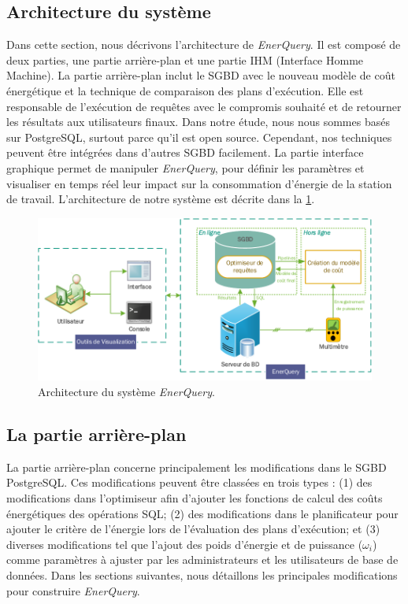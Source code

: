 \subsection{Architecture du système}\label{sec:Architecture}
Dans cette section, nous décrivons l'architecture de \textit{EnerQuery}. Il est composé de deux parties, une partie arrière-plan et une partie IHM (Interface Homme Machine). La partie arrière-plan inclut le SGBD avec le nouveau modèle de coût énergétique et la technique de comparaison des plans d'exécution. Elle est responsable de l'exécution de requêtes avec le compromis souhaité et de retourner les résultats aux utilisateurs finaux. Dans notre étude, nous nous sommes basés sur PostgreSQL, surtout parce qu'il est open source. Cependant, nos techniques peuvent être intégrées dans d'autres SGBD facilement. La partie interface graphique permet de manipuler \textit{EnerQuery}, pour définir les paramètres et visualiser en temps réel leur impact sur la consommation d'énergie de la station de travail.
L'architecture de notre système est décrite dans la \ref{fig:arch}.

\begin{figure}
	\centering
	\includegraphics[scale=0.85]{chapitre5/chap5Fig/arch.pdf}
	\caption{Architecture du système \textit{EnerQuery}.}
	\label{fig:arch}
\end{figure}

\subsection{La partie arrière-plan}
La partie arrière-plan concerne principalement les modifications dans le SGBD PostgreSQL. Ces modifications peuvent être classées en trois types : (1) des modifications dans l'optimiseur afin d'ajouter les fonctions de calcul des coûts énergétiques des opérations SQL; (2) des modifications dans le planificateur pour ajouter le critère de l'énergie lors de l'évaluation des plans d'exécution; et (3) diverses modifications tel que l'ajout des poids d'énergie et de puissance ($\omega_i$) comme paramètres à ajuster par les administrateurs et les utilisateurs de base de données. Dans les sections suivantes, nous détaillons les principales modifications pour construire \textit{EnerQuery}.

